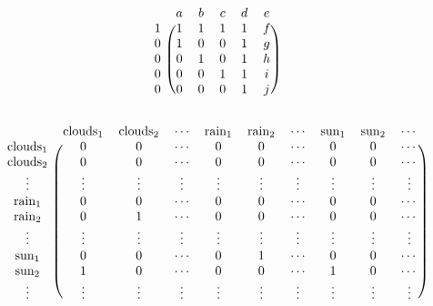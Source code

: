 \documentclass[12pt]{report}
\begin{document}
\[
\begin{blockarray}{cccccc}
& a & b & c & d & e \\
\begin{block}{c (ccccc)}
  1 & 1 & 1 & 1 & 1 & f \\
  0 & 1 & 0 & 0 & 1 & g \\
  0 & 0 & 1 & 0 & 1 & h \\
  0 & 0 & 0 & 1 & 1 & i \\
  0 & 0 & 0 & 0 & 1 & j \\
\end{block}
\end{blockarray}
\]

\[
\begin{blockarray}{cccccccccc}
& \text{clouds}_1 & \text{clouds}_2 & \cdots & \text{rain}_1 & \text{rain}_2 & \cdots & \text{sun}_1 & \text{sun}_2 & \cdots \\
\begin{block}{c(ccccccccc)}
\text{clouds}_1 & 0 & 0 & \cdots & 0 & 0 & \cdots & 0 & 0 & \cdots \\
\text{clouds}_2 & 0 & 0 & \cdots & 0 & 0 & \cdots & 0 & 0 & \cdots \\
\vdots & \vdots & \vdots & \vdots & \vdots & \vdots & \vdots & \vdots & \vdots & \vdots \\
\text{rain}_1 & 0 & 0 & \cdots & 0 & 0 & \cdots & 0 & 0 & \cdots \\
\text{rain}_2 & 0 & 1 & \cdots & 0 & 0 & \cdots & 0 & 0 & \cdots \\
\vdots & \vdots & \vdots & \vdots & \vdots & \vdots & \vdots & \vdots & \vdots & \vdots \\
\text{sun}_1 & 0 & 0 & \cdots & 0 & 1 & \cdots & 0 & 0 & \cdots \\
\text{sun}_2 & 1 & 0 & \cdots & 0 & 0 & \cdots & 1 & 0 & \cdots \\
\vdots & \vdots & \vdots & \vdots & \vdots & \vdots & \vdots & \vdots & \vdots & \vdots \\
\end{block}
\end{blockarray}
 \]
\end{document}

